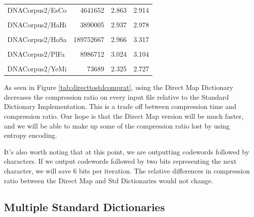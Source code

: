\documentclass[12pt,twoside]{reedthesis}
\begin{document}
\begin{table}[!h]
{\begin{tabular}[t]{l|r|r|r}
\hline
\cellcolor{gray!6}{DNACorpus2/EnIn} & \cellcolor{gray!6}{26403087} & \cellcolor{gray!6}{2.938} & \cellcolor{gray!6}{3.067}\\
\hline
DNACorpus2/EsCo & 4641652 & 2.863 & 2.914\\
\hline
\cellcolor{gray!6}{DNACorpus2/GaGa} & \cellcolor{gray!6}{148532294} & \cellcolor{gray!6}{2.832} & \cellcolor{gray!6}{3.170}\\
\hline
DNACorpus2/HaHi & 3890005 & 2.937 & 2.978\\
\hline
\cellcolor{gray!6}{DNACorpus2/HePy} & \cellcolor{gray!6}{1667825} & \cellcolor{gray!6}{2.913} & \cellcolor{gray!6}{2.943}\\
\hline
DNACorpus2/HoSa & 189752667 & 2.966 & 3.317\\
\hline
\cellcolor{gray!6}{DNACorpus2/OrSa} & \cellcolor{gray!6}{43262523} & \cellcolor{gray!6}{2.882} & \cellcolor{gray!6}{3.058}\\
\hline
DNACorpus2/PlFa & 8986712 & 3.024 & 3.104\\
\hline
\cellcolor{gray!6}{DNACorpus2/ScPo} & \cellcolor{gray!6}{10652155} & \cellcolor{gray!6}{2.885} & \cellcolor{gray!6}{2.967}\\
\hline
DNACorpus2/YeMi & 73689 & 2.325 & 2.727\\
\hline
\end{tabular}}
\end{table}
As seen in Figure \ref{tab:directtostdcomprat}, using the Direct Map Dictionary decreases the compression ratio on every input file relative to the Standard Dictionary Implementation. This is a trade off between compression time and compression ratio. Our hope is that the Direct Map version will be much faster, and we will be able to make up some of the compression ratio lost by using entropy encoding.

It's also worth noting that at this point, we are outputting codewords followed by characters. If we output codewords followed by two bits representing the next character, we will save 6 bits per iteration. The relative differences in compression ratio between the Direct Map and Std Dictionaries would not change.

\hypertarget{multiple-standard-dictionaries}{%
\subsection{Multiple Standard Dictionaries}\label{multiple-standard-dictionaries}}
\end{document}
